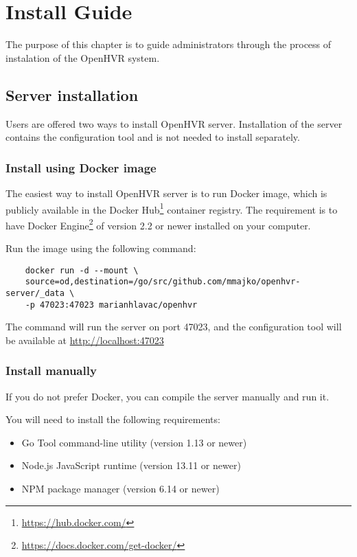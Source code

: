 \chapter{Install Guide}\label{installguide}

The purpose of this chapter is to guide administrators through the process
of instalation of the OpenHVR system.

\section*{Server installation}

Users are offered two ways to install OpenHVR server. Installation of the
server contains the configuration tool and is not needed to install separately.

\subsection*{Install using Docker image}

The easiest way to install OpenHVR server is to run Docker image, which is
publicly available in the Docker Hub\footnote{\href{https://hub.docker.com/}{https://hub.docker.com/}}
container registry. The requirement is to have Docker 
Engine\footnote{\href{https://docs.docker.com/get-docker/}{https://docs.docker.com/get-docker/}} of version 2.2 or
newer installed on your computer. 

Run the image using the following command:

\begin{verbatim}
    docker run -d --mount \
    source=od,destination=/go/src/github.com/mmajko/openhvr-server/_data \
    -p 47023:47023 marianhlavac/openhvr
\end{verbatim}

The command will run the server on port 47023, and the configuration tool will
be available at \href{http://localhost:47023}{http://localhost:47023}

\pagebreak

\subsection*{Install manually}

If you do not prefer Docker, you can compile the server manually and run it.

You will need to install the following requirements:

\begin{itemize}
    \itemsep0em
    \item Go Tool command-line utility (version 1.13 or newer)
    \item Node.js JavaScript runtime (version 13.11 or newer) 
    \item NPM package manager (version 6.14 or newer)
\end{itemize}

